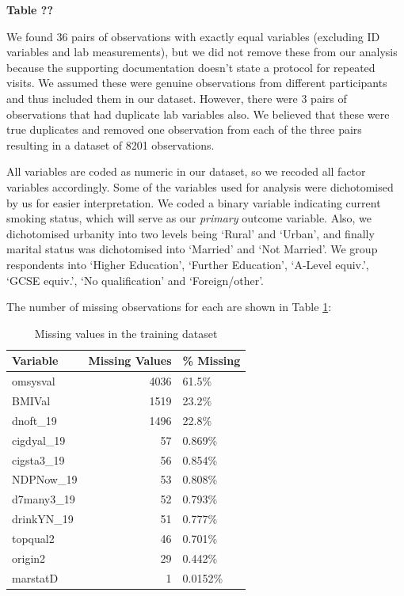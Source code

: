 \documentclass[
  11pt,
  twocolumn]{article}
\begin{document}
\textbf{Table ??}

We found 36 pairs of observations with exactly equal variables
(excluding ID variables and lab measurements), but we did not remove
these from our analysis because the supporting documentation doesn't
state a protocol for repeated visits. We assumed these were genuine
observations from different participants and thus included them in our
dataset. However, there were 3 pairs of observations that had duplicate
lab variables also. We believed that these were true duplicates and
removed one observation from each of the three pairs resulting in a
dataset of 8201 observations.

All variables are coded as numeric in our dataset, so we recoded all
factor variables accordingly. Some of the variables used for analysis
were dichotomised by us for easier interpretation. We coded a binary
variable indicating current smoking status, which will serve as our
\emph{primary} outcome variable. Also, we dichotomised urbanity into two
levels being `Rural' and `Urban', and finally marital status was
dichotomised into `Married' and `Not Married'. We group respondents into
`Higher Education', `Further Education', `A-Level equiv.', `GCSE
equiv.', `No qualification' and `Foreign/other'.

The number of missing observations for each are shown in Table
\ref{tab:output-na-table}:

\begin{table}

\caption{\label{tab:outputnatable}Missing values in the training dataset\label{tab:output-na-table}}
\centering
\begin{tabular}[t]{l|r|l}
\hline
\textbf{Variable} & \textbf{Missing Values} & \textbf{\% Missing}\\
\hline
omsysval & 4036 & 61.5\%\\
\hline
BMIVal & 1519 & 23.2\%\\
\hline
dnoft\_19 & 1496 & 22.8\%\\
\hline
cigdyal\_19 & 57 & 0.869\%\\
\hline
cigsta3\_19 & 56 & 0.854\%\\
\hline
NDPNow\_19 & 53 & 0.808\%\\
\hline
d7many3\_19 & 52 & 0.793\%\\
\hline
drinkYN\_19 & 51 & 0.777\%\\
\hline
topqual2 & 46 & 0.701\%\\
\hline
origin2 & 29 & 0.442\%\\
\hline
marstatD & 1 & 0.0152\%\\
\hline
\end{tabular}
\end{table}
\end{document}
